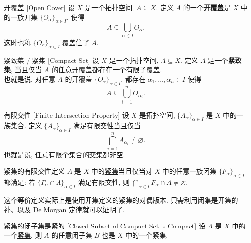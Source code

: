         \begin{vardfn}
            {开覆盖}
            [Open Cover]
            设 \(X\) 是一个拓扑空间, \(A\subseteq X\). 定义 \(A\) 的一个\textbf{开覆盖}是 \(X\) 中的一族开集 \(\{O_\alpha\}_{\alpha\in I}\), 使得 
            \[A\subseteq\bigcup_{\alpha\in I} O_\alpha.\]
            这时也称 \(\{O_\alpha\}_{\alpha\in I}\) 覆盖住了 \(A\).
        \end{vardfn}

        \begin{vardfn}
            [compact]
            {紧致集 / 紧集}
            [Compact Set]
            设 \(X\) 是一个拓扑空间, \(A\subseteq X\). 定义 \(A\) 是一个\textbf{紧致集}, 当且仅当 \(A\) 的任意开覆盖都存在一个有限子覆盖. \\
            也就是说, 对任意 \(A\) 的开覆盖 \(\{O_\alpha\}_{\alpha\in I}\), 都存在 \(\alpha_1,\dots,\alpha_n\in I\) 使得
            \[A\subseteq\bigcup_{i=1}^n O_{\alpha_i}.\]
        \end{vardfn}

        \begin{vardfn}
            {有限交性}
            [Finite Intersection Property]
            设 \(X\) 是拓扑空间, \(\{A_\alpha\}_{\alpha\in I}\) 是 \(X\) 中的一族集合. 定义 \(\{A_\alpha\}_{\alpha\in I}\) 满足有限交性当且仅当
            \[\bigcap_{i=1}^n A_{\alpha_i} \neq \varnothing.\]
            也就是说, 任意有限个集合的交集都非空.
        \end{vardfn}

        \begin{varthm}
            [compact]
            {紧集的有限交性定义}
            \(A\) 是 \(X\) 中的\hyperref[dfn:compact]{紧集}当且仅当对 \(X\) 中的任意一族闭集 \(\{F_\alpha\}_{\alpha\in I}\) 都满足:
            若 \(\{F_\alpha\cap A\}_{\alpha\in I}\) 满足有限交性, 则 \(\bigcap_{\alpha\in I} F_\alpha\cap A\neq\varnothing.\)
        \end{varthm}

        \begin{rmk}
            [Dedicatia]
            这个等价定义实际上是使用开集定义的紧集的对偶版本. 只需利用闭集是开集的补、以及 De Morgan 定律就可以证明了.
        \end{rmk}

        \begin{varthm}
            {紧集的闭子集是紧的}
            [Closed Subset of Compact Set is Compact]
            设 \(A\) 是 \(X\) 中的一个\hyperref[dfn:compact]{紧集}, 则 \(A\) 的任意闭子集 \(B\) 也是 \(X\) 中的一个紧集.
        \end{varthm}


